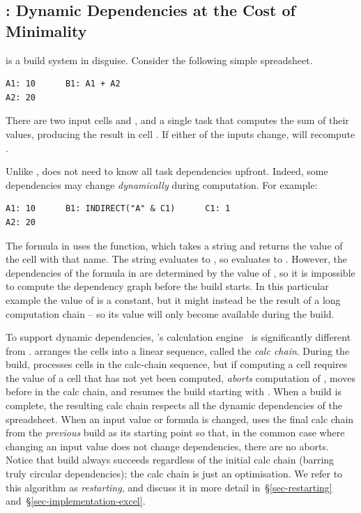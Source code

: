 \subsection{\Excel: Dynamic Dependencies at the Cost of Minimality}
\label{sec-background-excel}

\Excel is a build system in disguise. Consider the following simple spreadsheet.

\vspace{0.5mm}
\begin{verbatim}
A1: 10      B1: A1 + A2
A2: 20
\end{verbatim}
\vspace{0.5mm}

\noindent
There are two input cells  and , and a single task that computes
the sum of their values, producing the result in cell . If either of
the inputs change, \Excel will recompute .

Unlike \Make, \Excel does not need to know all task dependencies upfront.
Indeed, some dependencies may change \emph{dynamically} during computation. For
example:

\vspace{0.5mm}
\begin{verbatim}
A1: 10      B1: INDIRECT("A" & C1)      C1: 1
A2: 20
\end{verbatim}
\vspace{0.5mm}

\noindent
The formula in  uses the  function, which takes a string
and returns the value of the cell with that name.  The string evaluates to
, so  evaluates to . However, the dependencies of the
formula in  are determined by the value of , so it is impossible
to compute the dependency graph before the build starts. In this particular
example the value of  is a constant, but
it might instead be the result of a long computation chain --
so its value will only
become available during the build.

To support dynamic dependencies, \Excel's calculation engine~\cite{excel_recalc}
is significantly different from \Make. \Excel arranges the cells into a linear
sequence, called the \emph{calc chain}.  During the build, \Excel processes
cells in the calc-chain sequence, but if computing a cell  requires the
value of a cell  that has not yet been computed, \Excel \emph{aborts}
computation of , moves  before  in the calc chain, and
resumes the build starting with . When a build is complete, the resulting
calc chain respects all the dynamic dependencies of the spreadsheet. When an
input value or formula is changed, \Excel uses the final calc chain from the
\emph{previous} build as its starting point so that, in the common case where
changing an input value does not change dependencies, there are no aborts.
Notice that build always succeeds regardless of the initial calc chain (barring
truly circular dependencies); the calc chain is just an optimisation.
We refer to this algorithm as \emph{restarting}, and discuss it
in more detail in~\S\ref{sec-restarting} and~\S\ref{sec-implementation-excel}.


